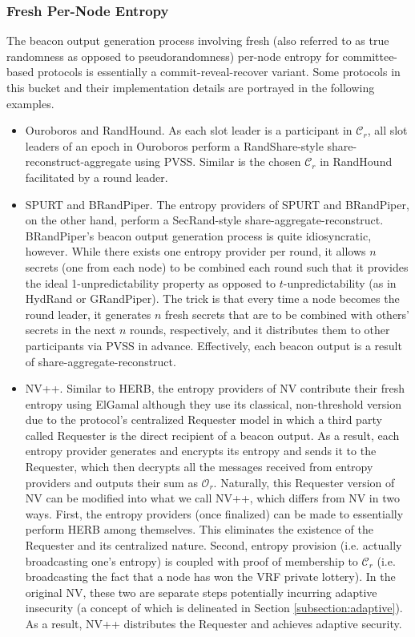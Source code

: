 \documentclass[letterpaper,twocolumn,10pt]{article}
\theoremstyle{definition}
\theoremstyle{remark}
\begin{document}
\subsubsection{Fresh Per-Node Entropy}
\label{subsubsection:fresh}
The beacon output generation process involving fresh (also referred to as true randomness \cite{cascudomt, das2021spurt} as opposed to pseudorandomness) per-node entropy for committee-based protocols is essentially a commit-reveal-recover variant. Some protocols in this bucket and their implementation details are portrayed in the following examples.
\begin{itemize}
\item Ouroboros and RandHound. As each slot leader is a participant in $\mathcal{C}_r$, all slot leaders of an epoch in Ouroboros perform a RandShare-style share-reconstruct-aggregate using PVSS. Similar is the chosen $\mathcal{C}_r$ in RandHound facilitated by a round leader.
\item SPURT and BRandPiper. The entropy providers of SPURT and BRandPiper, on the other hand, perform a SecRand-style share-aggregate-reconstruct. BRandPiper's beacon output generation process is quite idiosyncratic, however. While there exists one entropy provider per round, it allows $n$ secrets (one from each node) to be combined each round such that it provides the ideal 1-unpredictability property as opposed to $t$-unpredictability (as in HydRand or GRandPiper). The trick is that every time a node becomes the round leader, it generates $n$ fresh secrets that are to be combined with others' secrets in the next $n$ rounds, respectively, and it distributes them to other participants via PVSS in advance. Effectively, each beacon output is a result of share-aggregate-reconstruct.
\item NV++. Similar to HERB, the entropy providers of NV \cite{nguyen2019scalable} contribute their fresh entropy using ElGamal although they use its classical, non-threshold version due to the protocol's centralized Requester model in which a third party called Requester is the direct recipient of a beacon output. As a result, each entropy provider generates and encrypts its entropy and sends it to the Requester, which then decrypts all the messages received from entropy providers and outputs their sum as $\mathcal{O}_r$. Naturally, this Requester version of NV can be modified into what we call NV++, which differs from NV in two ways. First, the entropy providers (once finalized) can be made to essentially perform HERB among themselves. This eliminates the existence of the Requester and its centralized nature. Second, entropy provision (i.e. actually broadcasting one's entropy) is coupled with proof of membership to $\mathcal{C}_r$ (i.e. broadcasting the fact that a node has won the VRF private lottery). In the original NV, these two are separate steps potentially incurring adaptive insecurity (a concept of which is delineated in Section \ref{subsection:adaptive}). As a result, NV++ distributes the Requester and achieves adaptive security.
\end{itemize}
\end{document}
